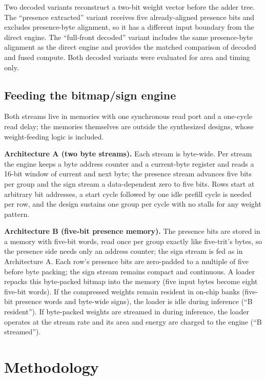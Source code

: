 \documentclass[11pt]{article}
\begin{document}
Two decoded variants reconstruct a two-bit weight vector before the adder tree. The ``presence extracted'' variant receives five already-aligned presence bits and excludes presence-byte alignment, so it has a different input boundary from the direct engine. The ``full-front decoded'' variant includes the same presence-byte alignment as the direct engine and provides the matched comparison of decoded and fused compute. Both decoded variants were evaluated for area and timing only.

\subsection{Feeding the bitmap/sign engine}

Both streams live in memories with one synchronous read port and a one-cycle read delay; the memories themselves are outside the synthesized designs, whose weight-feeding logic is included.

\textbf{Architecture A (two byte streams).} Each stream is byte-wide. Per stream the engine keeps a byte address counter and a current-byte register and reads a 16-bit window of current and next byte; the presence stream advances five bits per group and the sign stream a data-dependent zero to five bits. Rows start at arbitrary bit addresses, a start cycle followed by one idle prefill cycle is needed per row, and the design sustains one group per cycle with no stalls for any weight pattern.

\textbf{Architecture B (five-bit presence memory).} The presence bits are stored in a memory with five-bit words, read once per group exactly like five-trit's bytes, so the presence side needs only an address counter; the sign stream is fed as in Architecture A. Each row's presence bits are zero-padded to a multiple of five before byte packing; the sign stream remains compact and continuous. A loader repacks this byte-packed bitmap into the memory (five input bytes become eight five-bit words). If the compressed weights remain resident in on-chip banks (five-bit presence words and byte-wide signs), the loader is idle during inference (``B resident''). If byte-packed weights are streamed in during inference, the loader operates at the stream rate and its area and energy are charged to the engine (``B streamed'').

\section{Methodology}
\label{sec:method}
\end{document}
